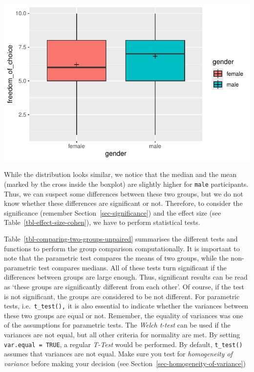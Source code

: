 \documentclass[
  letterpaper,
]{krantz}
\begin{document}
\includegraphics{11_group_comparison_files/figure-pdf/two-unpaired-groups-plot-1.pdf}

While the distribution looks similar, we notice that the median and the
mean (marked by the cross inside the boxplot) are slightly higher for
\texttt{male} participants. Thus, we can suspect some differences
between these two groups, but we do not know whether these differences
are significant or not. Therefore, to consider the significance
(remember Section~\ref{sec-significance}) and the effect size (see
Table~\ref{tbl-effect-size-cohen}), we have to perform statistical
tests.

Table~\ref{tbl-comparing-two-groups-unpaired} summarises the different
tests and functions to perform the group comparison computationally. It
is important to note that the parametric test compares the means of two
groups, while the non-parametric test compares medians. All of these
tests turn significant if the differences between groups are large
enough. Thus, significant results can be read as `these groups are
significantly different from each other'. Of course, if the test is not
significant, the groups are considered to be not different. For
parametric tests, i.e.~\texttt{t\_test(),} it is also essential to
indicate whether the variances between these two groups are equal or
not. Remember, the equality of variances was one of the assumptions for
parametric tests. The \emph{Welch t-test} can be used if the variances
are not equal, but all other criteria for normality are met. By setting
\texttt{var.equal\ =\ TRUE}, a regular \emph{T-Test} would be performed.
By default, \texttt{t\_test()} assumes that variances are not equal.
Make sure you test for \emph{homogeneity of variance} before making your
decision (see Section~\ref{sec-homogeneity-of-variance})
\end{document}
